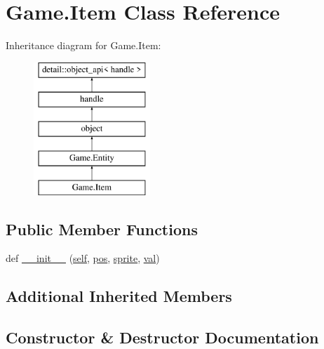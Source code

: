 \hypertarget{class_game_1_1_item}{}\section{Game.\+Item Class Reference}
\label{class_game_1_1_item}
Inheritance diagram for Game.\+Item\+:\begin{figure}[H]
\begin{center}
\leavevmode
\includegraphics[height=5.000000cm]{class_game_1_1_item}
\end{center}
\end{figure}
\subsection*{Public Member Functions}
\begin{DoxyCompactItemize}
\item 
def \mbox{\hyperlink{class_game_1_1_item_a6b6fa30ae17980fc0287e05504bf5e1d}{\+\_\+\+\_\+init\+\_\+\+\_\+}} (\mbox{\hyperlink{modsupport_8h_a0180ca1808366e5da641475e8bf8cca3}{self}}, \mbox{\hyperlink{class_game_1_1_entity_a982b731c21081324b5809d7a88781b43}{pos}}, \mbox{\hyperlink{class_game_1_1_entity_ac8064353c61c836135c530e8fc77842b}{sprite}}, \mbox{\hyperlink{_s_d_l__opengl__glext_8h_a26942fd2ed566ef553eae82d2c109c8f}{val}})
\end{DoxyCompactItemize}
\subsection*{Additional Inherited Members}


\subsection{Constructor \& Destructor Documentation}
\mbox{\label{class_game_1_1_item_a6b6fa30ae17980fc0287e05504bf5e1d}} 
